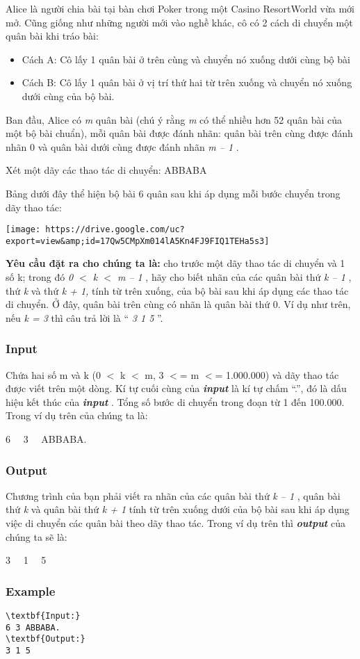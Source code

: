 

Alice là người chia bài tại bàn chơi Poker trong một Casino ResortWorld vừa mới mở. Cũng giống như những người mới vào nghề khác, cô có 2 cách di chuyển một quân bài khi tráo bài:
\begin{itemize}
	\item Cách A: Cô lấy 1 quân bài ở trên cùng và chuyển nó xuống dưới cùng bộ bài
	\item Cách B: Cô lấy 1 quân bài ở vị trí thứ hai từ trên xuống và chuyển nó xuống dưới cùng của bộ bài.
\end{itemize}

Ban đầu, Alice có \emph{ m } quân bài (chú ý rằng \emph{ m } có thể nhiều hơn 52 quân bài của một bộ bài chuẩn), mỗi quân bài được đánh nhãn: quân bài trên cùng được đánh nhãn 0 và quân bài dưới cùng được đánh nhãn \emph{ m – 1 } .

Xét một dãy các thao tác di chuyển: ABBABA

Bảng dưới đây thể hiện bộ bài 6 quân sau khi áp dụng mỗi bước chuyển trong dãy thao tác:


\texttt{[image: https://drive.google.com/uc?export=view\&amp;id=17Qw5CMpXm014lA5Kn4FJ9FIQ1TEHa5s3]}

\textbf{Yêu cầu đặt ra cho chúng ta là: } cho trước một dãy thao tác di chuyển và 1 số k; trong đó \emph{ 0 $<$ k $<$ m – 1 } , hãy cho biết nhãn của các quân bài thứ \emph{ k – 1 } , thứ \emph{ k } và thứ \emph{ k + 1, } tính từ trên xuống, của bộ bài sau khi áp dụng các thao tác di chuyển. Ở đây, quân bài trên cùng có nhãn là quân bài thứ 0. Ví dụ như trên, nếu \emph{ k = 3 } thì câu trả lời là “ \emph{ 3 1 5 } ”.

\subsubsection{Input}

Chứa hai số m và k (0 $<$ k $<$ m, 3 $<$= m $<$= 1.000.000) và dãy thao tác được viết trên một dòng. Kí tự cuối cùng của \textbf{\emph{ input }} là kí tự chấm “.”, đó là dấu hiệu kết thúc của \textbf{\emph{ input }} . Tổng số bước di chuyển trong đoạn từ 1 đến 100.000. Trong ví dụ trên của chúng ta là:

6   3   ABBABA.

\subsubsection{Output}

Chương trình của bạn phải viết ra nhãn của các quân bài thứ \emph{ k – 1 } , quân bài thứ \emph{ k } và quân bài thứ \emph{ k + 1 } tính từ trên xuống dưới của bộ bài sau khi áp dụng việc di chuyển các quân bài theo dãy thao tác. Trong ví dụ trên thì \textbf{\emph{ output }} của chúng ta sẽ là:

3   1   5

\subsubsection{Example}
\begin{verbatim}
\textbf{Input:}
6 3 ABBABA.
\textbf{Output:}
3 1 5\end{verbatim}